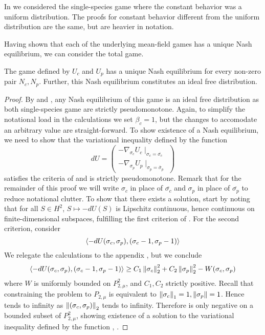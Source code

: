 \begin{remark}
  \label{rem:rem_ifd}
  In  we considered the single-species game where the constant behavior was a uniform distribution. The proofs for constant behavior different from the uniform distribution are the same, but are heavier in notation.
\end{remark}
Having shown that each of the underlying mean-field games has a unique Nash equilibrium, we can consider the total game.
\begin{proposition}
  \label{prop:exist_unique_nash}
  The game defined by $U_c$ and $U_p$ has a unique Nash equilibrium for every non-zero pair $N_c,N_p$. Further, this Nash equilibrium constitutes an ideal free distribution.
\end{proposition}
\begin{proof}
  By  and , any Nash equilibrium of this game is an ideal free distribution as both single-species game are strictly pseudomonotone. Again, to simplify the notational load in the calculations we set $\beta_c = 1$, but the changes to accomodate an arbitrary value are straight-forward. To show existence of a Nash equilibrium, we need to show that the variational inequality defined by the function
  \begin{equation}
    \label{eq:var_ineq}
    dU = \begin{pmatrix}-\nabla_{\sigma_c} U_c \mid_{\sigma_c = \overbar{\sigma_c}} \\ -\nabla_{\sigma_p} U_p \mid_{\sigma_p = \overbar{\sigma}_p}\end{pmatrix}
  \end{equation} satisfies the criteria of  and is strictly pseudomonotone. Remark that for the remainder of this proof we will write $\sigma_c$ in place of $\overbar{\sigma_c}$ and $\sigma_p$ in place of $\overbar{\sigma_p}$ to reduce notational clutter.
  To show that there exists a solution, start by noting that for all $S\in H^2$, $S\mapsto -dU(S)$ is Lipschitz continuous, hence continuous on finite-dimensional subspaces, fulfilling the first criterion of . For the second criterion, consider
  \begin{equation}
    \label{eq:du}
    \left \langle -dU(\sigma_c,\sigma_p),(\sigma_c-1, \sigma_p-1) \right \rangle
  \end{equation}
  We relegate the calculations to the appendix , but we conclude
  \begin{equation}
    \label{eq:fin_exist}
    \left \langle -dU(\sigma_c,\sigma_p),(\sigma_c-1, \sigma_p-1) \right \rangle \geq C_1\left \Vert \sigma_c \right \Vert_2^2 + C_2\left \Vert \sigma_p \right \Vert_2^2 - W(\sigma_c,\sigma_p)
  \end{equation}
  where $W$ is uniformly bounded on $P_{2,\mu}^2$, and $C_1,C_2$ strictly positive. Recall that constraining the problem to $P_{2,\mu}$ is equivalent to $\left \Vert \sigma_c \right \Vert_1 = 1, \left \Vert \sigma_p \right \Vert = 1$. Hence  tends to infinity as $\left \Vert (\sigma_c,\sigma_p) \right \Vert_2$ tends to infinity. Therefore  is only negative on a bounded subset of $P^2_{2,\mu}$, showing existence of a solution to the variational inequality defined by the function , .


\end{proof}
